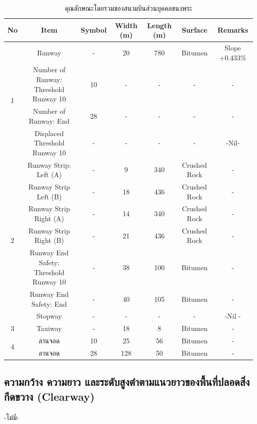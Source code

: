 \begin{landscape}
\begin{table}[h!]
\caption{คุณลักษณะโดยรวมของสนามบินส่วนบุคคลขนงพระ}
\begin{center}
\begin{tabular}{|c|c|c|c|c|c|c|}
\hline
\textbf{No} & \textbf{Item} & \textbf{Symbol} & \textbf{Width (m)} & \textbf{Length (m)} & \textbf{Surface} & \textbf{Remarks} \\
\hline
\multirow{4}{*}{1} & Runway & - & 20 & 780 & Bitumen & Slope +0.433\% \\ \cline{2-7}
   & Number of Runway: Threshold Runway 10 & 10 & - & - & - & - \\ \cline{2-7}
   & Number of Runway: End & 28 & - & - & - & - \\\cline{2-7}
   & Displaced Threshold Runway 10 & - & - & - & - & -Nil- \\ 
\hline
\multirow{7}{*}{2}  & Runway Strip: Left (A) & - & 9 & 340 & Crushed Rock & - \\ \cline{2-7}
   & Runway Strip Left (B) & - & 18 & 436 & Crushed Rock & - \\ \cline{2-7}
   & Runway Strip Right (A) & - & 14 & 340 & Crushed Rock & - \\ \cline{2-7}
   & Runway Strip Right (B) & - & 21 & 436 & Crushed Rock & - \\ \cline{2-7}
   & Runway End Safety: Threshold Runway 10 & - & 38 & 100 & Bitumen & - \\ \cline{2-7}
   & Runway End Safety: End & - & 40 & 105 & Bitumen & - \\ \cline{2-7}
   & Stopway & - & - & - & - & -Nil - \\ \cline{2-7}
\hline
3   & Taxiway & - & 18 & 8 & Bitumen & - \\
\hline
\multirow{2}{*}{4}   & ลานจอด & 10 & 25 & 56 & Bitumen & - \\ \cline{2-7}
   & ลานจอด & 28 & 128 & 50 & Bitumen & - \\
 \hline 
\end{tabular}
\end{center}
\label{คุณลักษณะโดยรวมของสนามบินส่วนบุคคลขนงพระ}
\end{table}%

\end{landscape}

\subsection{ความกว้าง ความยาว และระดับสูงตำตามแนวยาวของพื้นที่ปลอดสิ่งกีดขวาง (Clearway)}
-ไม่มี-

